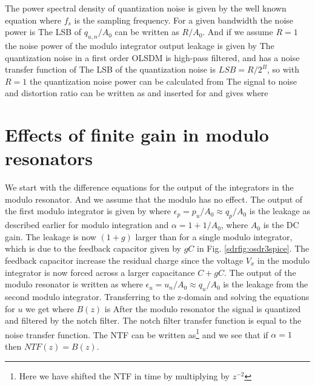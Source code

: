 The power spectral density of quantization noise is given by the
well known equation
where $f_s$ is the sampling frequency. For a given bandwidth the noise
power is
The LSB of $q_{u,n}/A_0$ can be written as $R/A_0$. And if we assume $R=1$
the noise power of the modulo integrator output leakage is given by
The quantization noise in a first order OLSDM is high-pass filtered, and has a
noise transfer function of
The LSB of the quantization noise is $LSB = R/2^B$, so with $R=1$ the
quantization noise power can be calculated from 
The signal to noise and distortion ratio can be written as 
and inserted for  and  gives
where

\section{Effects of finite gain in modulo resonators}
\label{sdrap:modresgain}
We start with the difference
equations for the output of the integrators in the modulo
resonator. And we assume that the modulo has no
effect. The output of the first modulo integrator is given by
where $\epsilon_p = p_u/A_0 \approx q_p/A_0$ is the leakage as described earlier for
modulo integration and $\alpha = 1 + 1/A_0$, where $A_0$ is the DC
gain. The leakage is now $(1+g)$ larger than for a single modulo integrator, which is due to the
feedback capacitor given by $gC$ in Fig. \ref{sdrfig:osdr3spice}. The
feedback capacitor increase the residual charge since the voltage
$V_x$ in the modulo integrator is now forced across a larger
capacitance $C + gC$. The output of the modulo resonator is written as
where $\epsilon_u = u_n/A_0 \approx q_u/A_0$ is the leakage from the
second modulo integrator.
Transferring to the z-domain and solving the equations for $u$ we get
where $B(z)$ is
After the modulo resonator the signal is quantized and filtered by the
notch filter. The notch filter transfer function is equal to the noise
transfer function. The NTF can be written as\footnote{Here we have
  shifted the NTF in time by multiplying by $z^{-2}$}
and we see that if $\alpha = 1$ then $NTF(z) = B(z)$. 


